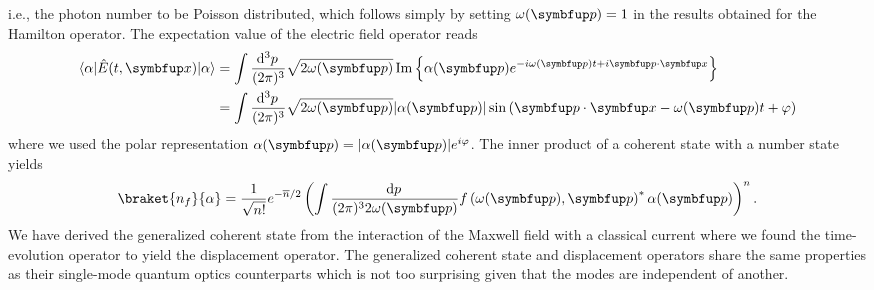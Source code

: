 i.e., the photon number to be Poisson distributed, which follows simply by setting $\omega(\vb{p})=1$ in the results obtained for the Hamilton operator.
The expectation value of the electric field operator reads
\begin{equation}
	\begin{split}
		\bra{\alpha}
		\hat{E}(t,\vb{x})
		\ket{\alpha}
		&=
		\int\frac{\dd[3]{p}}{(2\pi)^3}
		\sqrt{2\omega(\vb{p})}
		\Im\left\{
			\alpha(\vb{p})
			e^{-i\omega(\vb{p})t+i\vb{p}\vdot\vb{x}}
		\right\}
		\\
		&=
		\int\frac{\dd[3]{p}}{(2\pi)^3}
		\sqrt{2\omega(\vb{p})}
		\abs*{\alpha(\vb{p})}
		\sin\left(
			\vb{p}\vdot\vb{x}
			-
			\omega(\vb{p})t
			+
			\varphi
		\right)
	\end{split}
	\label{eq:coherent_state_electric_expval}
\end{equation}
where we used the polar representation $\alpha(\vb{p})=\abs*{\alpha(\vb{p})}e^{i\varphi}$.
The inner product of a coherent state with a number state yields
\begin{equation}
	\braket{n_f}{\alpha}
	=
	\frac{1}{\sqrt{n!}}
	e^{-\overline{n}/2}
	\left(
		\int\frac{\dd{p}}{(2\pi)^32\omega(\vb{p})}
		f\left(\omega(\vb{p}),\vb{p}\right)^*
		\alpha(\vb{p})
	\right)^n
	\label{eq:coherent_state_inner_number}
	.
\end{equation}
We have derived the generalized coherent state from the interaction of the Maxwell field with a classical current where we found the time-evolution operator to yield the displacement operator.
The generalized coherent state and displacement operators share the same properties as their single-mode quantum optics counterparts which is not too surprising given that the modes are independent of another.